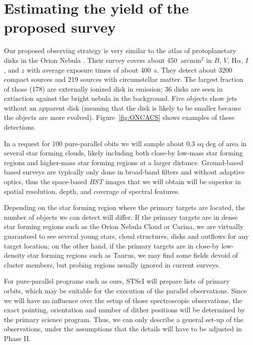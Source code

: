 \documentclass[12pt]{article}
\begin{document}
\section{Estimating the yield of the proposed survey}
Our proposed observing strategy is very similar to the atlas of protoplanetary disks in the Orion Nebula \citep{2008AJ....136.2136R,2013ApJS..207...10R}. Their survey covers about 450~arcmin$^2$ in $B$, $V$, H$\alpha$, $I$, and $z$ with average exposure times of about 400~s. They detect about 3200 compact sources and 219 sources with circumstellar matter. The largest fraction of those (178) are externally ionized disk in emission; 36 disks are seen in extinction against the bright nebula in the background. Five objects show jets without an apparent disk (meaning that the disk is likely to be smaller because the objects are more evolved). Figure~\ref{fig:ONCACS} shows examples of these detections. 

In a request for 100 pure-parallel obits we will sample about 0.3 sq deg of
area in several star forming clouds, likely including both close-by low-mass
star forming regions and higher-mass star forming regions at a larger distance.
 Ground-based based surveys are typically only done in broad-band
filters \citep[IPHAS, which also includes an H$\alpha$ filter is an
  exception][]{2005MNRAS.362..753D} and without adaptive optics, thus the
space-based \emph{HST} images that we will obtain will be superior in spatial
resolution, depth, and coverage of spectral features.


Depending on the star forming region where the primary targets are located, the
number of objects we can detect will differ. If the primary targets are in
dense star forming regions such as the Orion Nebula Cloud or Carina, we are
virtually guaranteed to see several young stars, cloud structures, disks and
outflows for any target location; on the other hand, if the primary targets are
in close-by low-density star forming regions such as Taurus, we may find some
fields devoid of cluster members, but probing regions usually ignored in current surveys. 





%
%
\describeobservations   %
For pure-parallel programs such as ours, STScI will prepare lists of primary orbits, which may be suitable for the execution of the parallel observations. Since we will have no influence over the setup of those spectroscopic observations, the exact pointing, orientation and number of dither positions will be determined by the primary science program. Thus, we can only describe a general set-up of the observations, under the assumptions that the details will have to be adjusted in Phase II.
\end{document}
